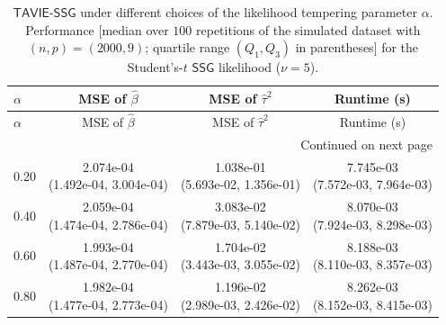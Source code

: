 \documentclass[12pt]{article}
\numberwithin{equation}{section}
\newcommand{\ssg}{\mathsf{SSG}}
\newcommand{\tssg}{\mathsf{TAVIE}\text{-}\mathsf{SSG}}
\begin{document}
{\scriptsize
\setlength{\tabcolsep}{6pt} %
\renewcommand{\arraystretch}{1.15}%
\begin{longtable}{lccc}
\caption{\footnotesize{$\tssg$ under different choices of the likelihood tempering parameter $\alpha$. Performance [median over $100$ repetitions of the simulated dataset with $(n, p) = (2000, 9)$; quartile range $(Q_1, Q_3)$ in parentheses] for the Student's-$t$ $\ssg$ likelihood ($\nu=5$).}} \label{tab:Student-different-alpha}\\
\toprule
\toprule
$\alpha$ & MSE of $\widehat{\beta}$ & MSE of $\widehat{\tau}^{2}$ & Runtime (s) \\
\midrule
\endfirsthead

\toprule
$\alpha$ & MSE of $\widehat{\beta}$ & MSE of $\widehat{\tau}^{2}$ & Runtime (s) \\
\midrule
\endhead

\midrule
\multicolumn{4}{r}{Continued on next page} \\
\midrule
\endfoot

\bottomrule
\bottomrule
\endlastfoot

0.20 & 
  \makecell[c]{2.074e-04\\(1.492e-04, 3.004e-04)} &
  \makecell[c]{1.038e-01\\(5.693e-02, 1.356e-01)} &
  \makecell[c]{7.745e-03\\(7.572e-03, 7.964e-03)} \\

0.40 & 
  \makecell[c]{2.059e-04\\(1.474e-04, 2.786e-04)} &
  \makecell[c]{3.083e-02\\(7.879e-03, 5.140e-02)} &
  \makecell[c]{8.070e-03\\(7.924e-03, 8.298e-03)} \\

0.60 & 
  \makecell[c]{1.993e-04\\(1.487e-04, 2.770e-04)} &
  \makecell[c]{1.704e-02\\(3.443e-03, 3.055e-02)} &
  \makecell[c]{8.188e-03\\(8.110e-03, 8.357e-03)} \\

0.80 & 
  \makecell[c]{1.982e-04\\(1.477e-04, 2.773e-04)} &
  \makecell[c]{1.196e-02\\(2.989e-03, 2.426e-02)} &
  \makecell[c]{8.262e-03\\(8.152e-03, 8.415e-03)} \\


\end{longtable}}
\end{document}
